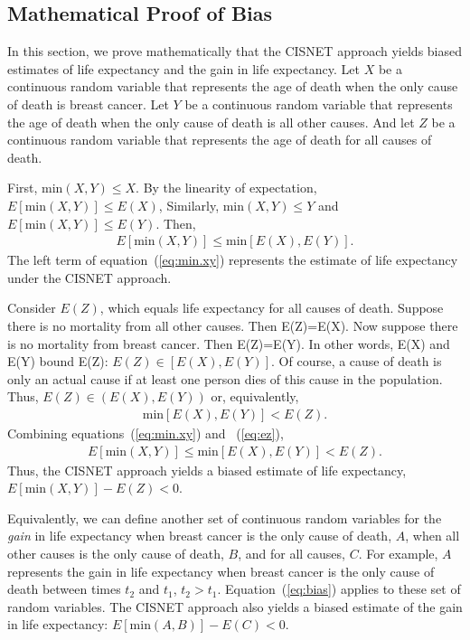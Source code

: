 \documentclass[11pt,letterpaper]{article}
\theoremstyle{plain}
\begin{document}
\subsection{Mathematical Proof of Bias}
In this section, we prove mathematically that the CISNET approach
yields biased estimates of life expectancy and the gain in life
expectancy.  Let $X$ be a continuous random variable that represents the
age of death when the only cause of death is breast cancer.  Let $Y$ be
a continuous random variable that represents the age of death when the
only cause of death is all other causes.  And let $Z$ be a continuous
random variable that represents the age of death for all causes of
death.

First, $\text{min}(X,Y) \leq X$.  By the linearity of expectation,
$E[\text{min}(X,Y)] \leq E(X)$,  Similarly, $\text{min}(X,Y) \leq Y$ and
$E[\text{min}(X,Y)] \leq E(Y)$.  Then, 
\begin{eqnarray}
E[\text{min}(X,Y)] \leq \text{min}[E(X),E(Y)]. 
\label{eq:min.xy}
\end{eqnarray}
 The left term of equation~(\ref{eq:min.xy}) represents the estimate of
 life expectancy under the CISNET approach.  

Consider $E(Z)$, which equals life expectancy for all causes of
death.  Suppose there is no mortality from all other causes.  Then
E(Z)=E(X).  Now suppose there is no mortality from breast cancer.
Then E(Z)=E(Y).  In other words, E(X) and E(Y) bound E(Z): $E(Z) \in \left[ E(X),E(Y) \right]$.  Of course,
a cause of death is only an actual cause if at least one person dies
of this cause in the population.  Thus, $E(Z) \in \left( E(X),E(Y) \right)$ or,
equivalently,  
\begin{eqnarray}
\text{min}[E(X),E(Y)] < E(Z).  
\label{eq:ez}
\end{eqnarray}
Combining equations~(\ref{eq:min.xy}) and ~(\ref{eq:ez}), 
\begin{eqnarray} 
E[\text{min}(X,Y)] \leq \text{min}[E(X),E(Y)] < E(Z).
\label{eq:bias}
\end{eqnarray}
Thus, the CISNET approach yields a biased estimate of life expectancy,
$E[\text{min}(X,Y)] - E(Z) < 0$.  

Equivalently, we can define another set of continuous random variables
for the {\it gain} in life expectancy when breast cancer is the only
cause of death, $A$, when all other causes is the only cause of death,
$B$, and for all causes, $C$.  For example, $A$ represents the gain in
life expectancy when breast cancer is the only cause of death between
times $t_2$ and $t_1$, $t_2>t_1$.  Equation~(\ref{eq:bias}) applies to
these set of random variables.  The CISNET approach also yields a
biased estimate of the gain in life expectancy: $E[\text{min}(A,B)] -
E(C) < 0$.
\end{document}
